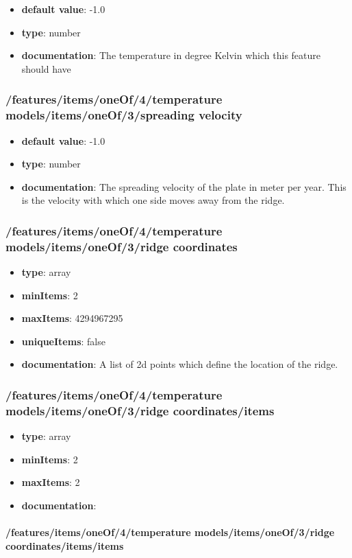 \begin{itemize}\item {\bf default value}: -1.0
\item {\bf type}: number
\item {\bf documentation}: The temperature in degree Kelvin which this feature should have
\end{itemize}\subsubsection{/features/items/oneOf/4/temperature models/items/oneOf/3/spreading velocity}
\begin{itemize}\item {\bf default value}: -1.0
\item {\bf type}: number
\item {\bf documentation}: The spreading velocity of the plate in meter per year. This is the velocity with which one side moves away from the ridge.
\end{itemize}\subsubsection{/features/items/oneOf/4/temperature models/items/oneOf/3/ridge coordinates}
\begin{itemize}\item {\bf type}: array
\item {\bf minItems}: 2
\item {\bf maxItems}: 4294967295
\item {\bf uniqueItems}: false
\item {\bf documentation}: A list of 2d points which define the location of the ridge.
\end{itemize}\subsubsection{/features/items/oneOf/4/temperature models/items/oneOf/3/ridge coordinates/items}
\begin{itemize}\item {\bf type}: array
\item {\bf minItems}: 2
\item {\bf maxItems}: 2
\item {\bf documentation}: 
\end{itemize}\paragraph{/features/items/oneOf/4/temperature models/items/oneOf/3/ridge coordinates/items/items}
